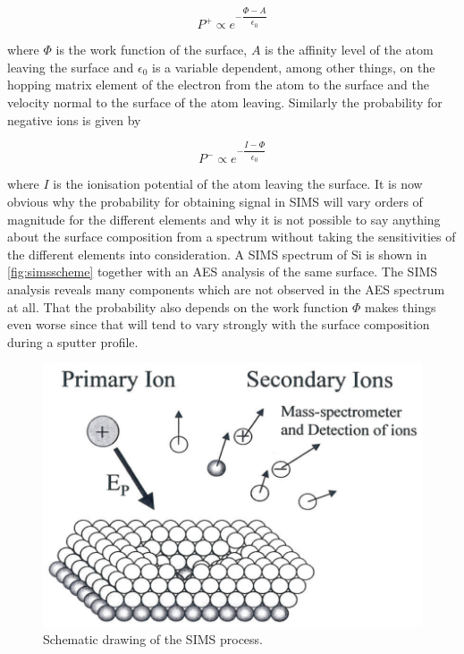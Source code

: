 \begin{equation}
P^+\propto e^{-\dfrac{\Phi-A}{\epsilon_0}} 
\end{equation}

\noindent where $\Phi$ is the work function of the surface, $A$ is the affinity level of the atom leaving the surface and $\epsilon_0$ is a variable dependent, among other things, on the hopping matrix element of the electron from the atom to the surface and the velocity normal to the surface of the atom leaving. Similarly the probability for negative ions is given by

\begin{equation}
P^-\propto e^{-\dfrac{I-\Phi}{\epsilon_0}} 
\end{equation}

\noindent where $I$ is the ionisation potential of the atom leaving the surface. It is now obvious why the probability for obtaining signal in SIMS will vary orders of magnitude for the different elements and why it is not possible to say anything about the surface composition from a spectrum without taking the sensitivities of the different elements into consideration.  A SIMS spectrum of Si is shown in \autoref{fig:simsscheme} together with an AES analysis of the same surface. The SIMS analysis reveals many components which are not observed in the AES spectrum at all. That the probability also depends on the work function $\Phi$ makes things even worse since that will tend to vary strongly with the surface composition during a sputter profile.

\begin{figure}[h!]
	\begin{center}
	\includegraphics[scale=3]{figures/11_06.png}
	\caption{Schematic drawing of the SIMS process.}
	\label{fig:simsscheme}
	\end{center}
\end{figure}

